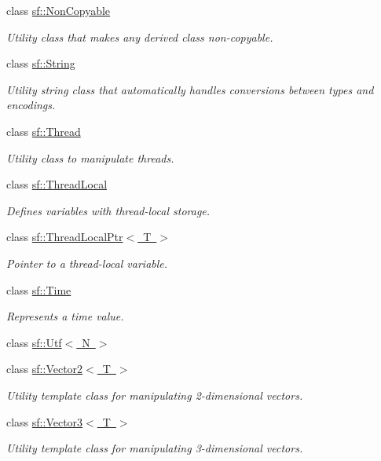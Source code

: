 \begin{DoxyCompactItemize}
class \mbox{\hyperlink{classsf_1_1_non_copyable}{sf\+::\+Non\+Copyable}}
\begin{DoxyCompactList}\small\item\em Utility class that makes any derived class non-\/copyable. \end{DoxyCompactList}\item 
class \mbox{\hyperlink{classsf_1_1_string}{sf\+::\+String}}
\begin{DoxyCompactList}\small\item\em Utility string class that automatically handles conversions between types and encodings. \end{DoxyCompactList}\item 
class \mbox{\hyperlink{classsf_1_1_thread}{sf\+::\+Thread}}
\begin{DoxyCompactList}\small\item\em Utility class to manipulate threads. \end{DoxyCompactList}\item 
class \mbox{\hyperlink{classsf_1_1_thread_local}{sf\+::\+Thread\+Local}}
\begin{DoxyCompactList}\small\item\em Defines variables with thread-\/local storage. \end{DoxyCompactList}\item 
class \mbox{\hyperlink{classsf_1_1_thread_local_ptr}{sf\+::\+Thread\+Local\+Ptr$<$ T $>$}}
\begin{DoxyCompactList}\small\item\em Pointer to a thread-\/local variable. \end{DoxyCompactList}\item 
class \mbox{\hyperlink{classsf_1_1_time}{sf\+::\+Time}}
\begin{DoxyCompactList}\small\item\em Represents a time value. \end{DoxyCompactList}\item 
class \mbox{\hyperlink{classsf_1_1_utf}{sf\+::\+Utf$<$ N $>$}}
\item 
class \mbox{\hyperlink{classsf_1_1_vector2}{sf\+::\+Vector2$<$ T $>$}}
\begin{DoxyCompactList}\small\item\em Utility template class for manipulating 2-\/dimensional vectors. \end{DoxyCompactList}\item 
class \mbox{\hyperlink{classsf_1_1_vector3}{sf\+::\+Vector3$<$ T $>$}}
\begin{DoxyCompactList}\small\item\em Utility template class for manipulating 3-\/dimensional vectors. \end{DoxyCompactList}\end{DoxyCompactItemize}
